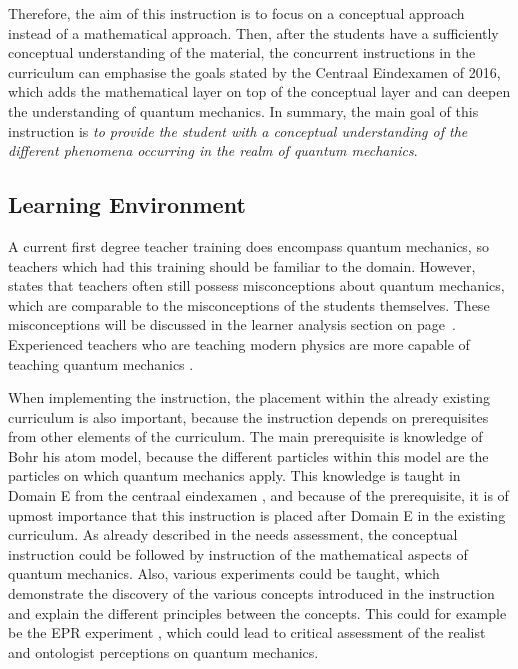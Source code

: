 \documentclass[11pt,twoside]{report} %
\begin{document}
Therefore, the aim of this instruction is to focus on a conceptual approach instead of a mathematical approach. Then, after the students have a sufficiently conceptual understanding of the material, the concurrent instructions in the curriculum can emphasise the goals stated by the Centraal Eindexamen of 2016, which adds the mathematical layer on top of the conceptual layer and can deepen the understanding of quantum mechanics. In summary, the main goal of this instruction is \emph{to provide the student with a conceptual understanding of the different phenomena occurring in the realm of quantum mechanics}.


\subsection{Learning Environment}
\label{subsec:learningenvironment}

A current first degree teacher training \cite{leraarnatuurkundemaster} does encompass quantum mechanics, so teachers which had this training should be familiar to the domain. However,  states that teachers often still possess misconceptions about quantum mechanics, which are comparable to the misconceptions of the students themselves. These misconceptions will be discussed in the learner analysis section on page~\pageref{ch:learneranalysis}. Experienced teachers who are teaching modern physics are more capable of teaching quantum mechanics \cite{asikainen}.

When implementing the instruction, the placement within the already existing curriculum is also important, because the instruction depends on prerequisites from other elements of the curriculum. The main prerequisite is knowledge of Bohr his atom model, because the different particles within this model are the particles on which quantum mechanics apply. This knowledge is taught in Domain E from the centraal eindexamen \cite{eindexamen2016}, and because of the prerequisite, it is of upmost importance that this instruction is placed after Domain E in the existing curriculum. As already described in the needs assessment, the conceptual instruction could be followed by instruction of the mathematical aspects of quantum mechanics. Also, various experiments could be taught, which demonstrate the discovery of the various concepts introduced in the instruction and explain the different principles between the concepts. This could for example be the EPR experiment \cite{kuttner, muller, velentzas}, which could lead to critical assessment of the realist and ontologist perceptions on quantum mechanics.
\end{document}
